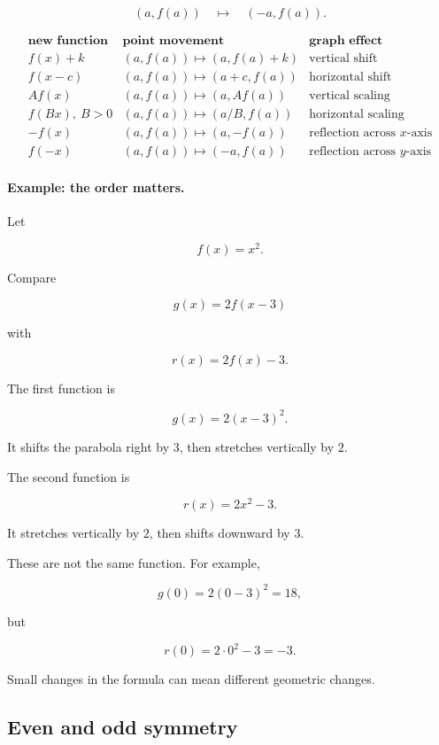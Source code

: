 \[
(a,f(a))
\quad\longmapsto\quad
(-a,f(a)).
\]

\begin{center}
\[
\begin{array}{c|c|c}
\textbf{new function} & \textbf{point movement} & \textbf{graph effect} \\ \hline
f(x)+k & (a,f(a))\mapsto(a,f(a)+k) & \text{vertical shift} \\
f(x-c) & (a,f(a))\mapsto(a+c,f(a)) & \text{horizontal shift} \\
Af(x) & (a,f(a))\mapsto(a,Af(a)) & \text{vertical scaling} \\
f(Bx),\ B>0 & (a,f(a))\mapsto(a/B,f(a)) & \text{horizontal scaling} \\
-f(x) & (a,f(a))\mapsto(a,-f(a)) & \text{reflection across \(x\)-axis} \\
f(-x) & (a,f(a))\mapsto(-a,f(a)) & \text{reflection across \(y\)-axis}
\end{array}
\]
\end{center}

\paragraph{Example: the order matters.}
Let

\[
f(x)=x^2.
\]

Compare

\[
g(x)=2f(x-3)
\]

with

\[
r(x)=2f(x)-3.
\]

The first function is

\[
g(x)=2(x-3)^2.
\]

It shifts the parabola right by \(3\), then stretches vertically by \(2\).

The second function is

\[
r(x)=2x^2-3.
\]

It stretches vertically by \(2\), then shifts downward by \(3\).

These are not the same function. For example,

\[
g(0)=2(0-3)^2=18,
\]

but

\[
r(0)=2\cdot 0^2-3=-3.
\]

Small changes in the formula can mean different geometric changes.

\subsection{Even and odd symmetry}
\label{subsec:even-odd-symmetry}

